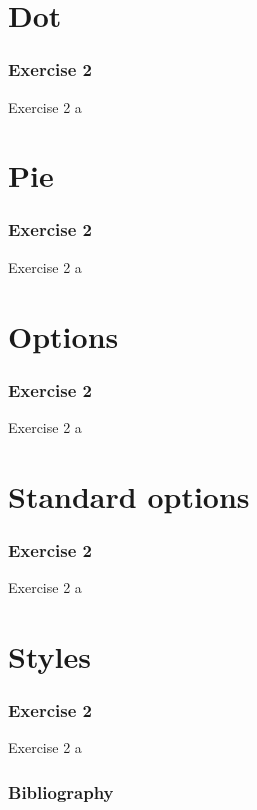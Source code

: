 \documentclass[11pt, aspectratio=169]{beamer}
\begin{document}
	\section{Dot}
		\begin{frame}
			\frametitle{Exercise 2}
			\begin{block}{Exercise 2}
				a
			\end{block}
		\end{frame}
	\section{Pie}
		\begin{frame}
			\frametitle{Exercise 2}
			\begin{block}{Exercise 2}
				a
			\end{block}
		\end{frame}
	\section{Options}
		\begin{frame}
			\frametitle{Exercise 2}
			\begin{block}{Exercise 2}
				a
			\end{block}
		\end{frame}
	\section{Standard options}
		\begin{frame}
			\frametitle{Exercise 2}
			\begin{block}{Exercise 2}
				a
			\end{block}
		\end{frame}
	\section{Styles}
		\begin{frame}
			\frametitle{Exercise 2}
			\begin{block}{Exercise 2}
				a
			\end{block}
		\end{frame}
	\begin{frame}[t] %
		\frametitle{Bibliography}
		
		
		\nocite{mitchell-2008}
	\end{frame}
	\begin{frame}
		\maketitle
	\end{frame}
\end{document}

